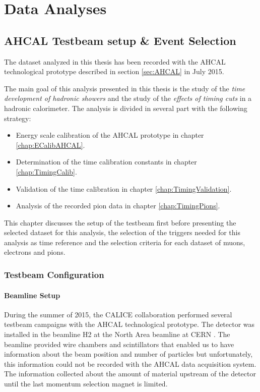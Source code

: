 \part{Data Analyses}
\label{chap:TimingAHCAL}

\chapter{AHCAL Testbeam setup \& Event Selection}
\label{chap:EvtSelection}

The dataset analyzed in this thesis has been recorded with the AHCAL technological prototype described in section \ref{sec:AHCAL} in July 2015.

The main goal of this analysis presented in this thesis is the study of the \textit{time development of hadronic showers} and the study of the \textit{effects of timing cuts} in a hadronic calorimeter. The analysis is divided in several part with the following strategy:
\begin{itemize}
	\item Energy scale calibration of the AHCAL prototype in chapter \ref{chap:ECalibAHCAL}.
	\item Determination of the time calibration constants in chapter \ref{chap:TimingCalib}.
	\item Validation of the time calibration in chapter \ref{chap:TimingValidation}.
	\item Analysis of the recorded pion data in chapter \ref{chap:TimingPions}.
\end{itemize}

This chapter discusses the setup of the testbeam first before presenting the selected dataset for this analysis, the selection of the triggers needed for this analysis as time reference and the selection criteria for each dataset of muons, electrons and pions.

\section{Testbeam Configuration}

\subsection{Beamline Setup}
\label{sec:beamline}

During the summer of 2015, the CALICE collaboration performed several testbeam campaigns with the AHCAL technological prototype. The detector was installed in the beamline H2 at the North Area beamline at CERN \cite{H2Beamline}. The beamline provided wire chambers and scintillators that enabled us to have information about the beam position and number of particles but unfortunately, this information could not be recorded with the AHCAL data acquisition system. The information collected about the amount of material upstream of the detector until the last momentum selection magnet is limited.

